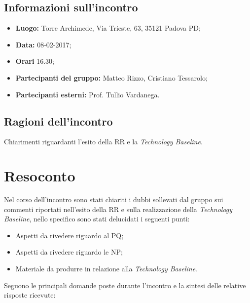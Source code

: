 \documentclass[openany,12pt,a4paper]{article}
\begin{document}
  \subsection{Informazioni sull'incontro} 
   
  \begin{itemize}  
      \item \textbf{Luogo:} Torre Archimede, Via Trieste, 63, 35121 Padova PD;
      \item \textbf{Data:} 08-02-2017; 
      \item \textbf{Orari} 16.30;
      \item \textbf{Partecipanti del gruppo:} Matteo Rizzo, Cristiano Tessarolo; 
      \item \textbf{Partecipanti esterni:} Prof. Tullio Vardanega. 
  \end{itemize} 
 
  \subsection{Ragioni dell'incontro} 
  Chiarimenti riguardanti l'esito della RR e la \textit{Technology Baseline}. 
 
  \section{Resoconto} 
  Nel corso dell'incontro sono stati chiariti i dubbi sollevati dal gruppo sui commenti riportati nell'esito della RR e sulla realizzazione della \textit{Technology Baseline}, nello specifico sono stati delucidati i seguenti punti:
	
  \begin{itemize}
	\item Aspetti da rivedere riguardo al PQ;
	\item Aspetti da rivedere riguardo le NP;
	\item Materiale da produrre in relazione alla \textit{Technology Baseline}.
  \end{itemize}
	
  \noindent Seguono le principali domande poste durante l'incontro e la sintesi delle relative risposte ricevute:
\end{document}
